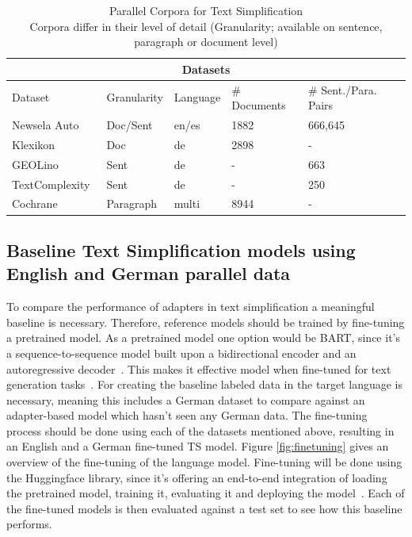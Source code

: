 \begin{table}[h!]
    \centering
    \begin{tabular}{ |p{3cm}|p{2.5cm}|p{2.5cm}|p{2.5cm}|p{2.5cm}| }
        \hline
        \multicolumn{5}{|c|}{Datasets} \\
        \hline
        Dataset & Granularity & Language & \# Documents & \# Sent./Para. Pairs \\
        \hline
        Newsela Auto~\cite{Xu2015} & Doc/Sent & en/es & 1882 & 666,645 \\
        Klexikon~\cite{Aumiller2022} & Doc & de & 2898 & - \\
        GEOLino~\cite{Mallinson2020} & Sent & de & - & 663 \\
        TextComplexity~\cite{Mallinson2020} & Sent & de & - & 250 \\
        Cochrane~\cite{Devaraj2021} & Paragraph & multi & 8944 & - \\
        \hline
    \end{tabular}
    \caption{Parallel Corpora for Text Simplification\\
        Corpora differ in their level of detail (Granularity; available on sentence, paragraph or document level)
    }
    \label{table:datasets}
\end{table}


\subsection{Baseline Text Simplification models using English and German parallel data}
To compare the performance of adapters in text simplification a meaningful baseline is necessary.
Therefore, reference models should be trained by fine-tuning a pretrained model.
As a pretrained model one option would be BART, since it's a sequence-to-sequence model
built upon a bidirectional encoder and an autoregressive decoder~\cite{Lewis2019}.
This makes it effective model when fine-tuned for text generation tasks~\cite{Lewis2019}.
For creating the baseline labeled data in the target language is necessary, meaning this includes a German dataset to compare against
an adapter-based model which hasn't seen any German data.
The fine-tuning process should be done using each of the datasets mentioned above,
resulting in an English and a German fine-tuned TS model.
Figure \ref{fig:finetuning} gives an overview of the fine-tuning of the language model.
Fine-tuning will be done using the Huggingface library, since it's offering an end-to-end
integration of loading the pretrained model, training it, evaluating it and deploying the model~\cite{Huggingface2023}.
Each of the fine-tuned models is then evaluated against a test set to see how this
baseline performs.

